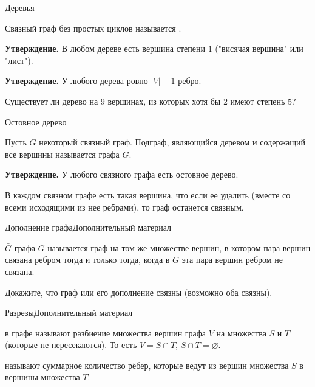 \begin{frame}{Деревья}

 Связный граф без простых циклов называется .

\spc
{\bf Утверждение.} В любом дереве есть вершина степени $1$ ("висячая вершина" или "лист").

\spc
{\bf Утверждение.} У  любого дерева ровно $|V|-1$ ребро.

\vspace{5 pt}
\exmpl Существует ли дерево на $9$ вершинах, из которых хотя бы $2$ имеют степень $5$?

\end{frame}

\begin{frame}{Остовное дерево}

 Пусть $G$ некоторый связный граф. Подграф, являющийся деревом и содержащий все вершины называется  графа $G$.

\spc
{\bf Утверждение.} У  любого связного графа есть остовное дерево.

\exmpl В каждом связном графе есть такая вершина, что если ее удалить (вместе со
всеми исходящими из нее ребрами), то граф останется связным.


\end{frame}

\begin{frame}{Дополнение графа}{Дополнительный материал}

 {} $\bar{G}$ графа $G$ называется граф на том же множестве вершин, в котором пара вершин связана ребром тогда и только тогда, когда в $G$ эта пара вершин ребром не связана.


\exmpl Докажите, что граф или его дополнение связны (возможно оба связны).


\end{frame}



\begin{frame}{Разрезы}{Дополнительный материал}

 {} в графе называют разбиение множества вершин графа $V$
на множества $S$ и $T$ (которые не пересекаются). То есть $V = S \cap T$,
$S \cap T = \varnothing$.

 {} называют суммарное
количество рёбер, которые ведут из вершин множества $S$ в вершины
множества $T$.

\end{frame}

